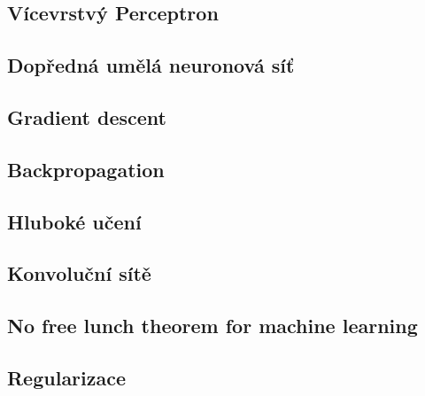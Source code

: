 \subsection{Vícevrstvý Perceptron}
\label{sec:multilayer_perceptron}

\subsection{Dopředná umělá neuronová síť}
\label{sec:feedforward_nn}
\subsection{Gradient descent}
\label{sec:gradient_descent}
\subsection{Backpropagation}
\subsection{Hluboké učení}
\label{sec:deep_learning}
\subsection{Konvoluční sítě}
\label{sec:cnn}

\subsection{No free lunch theorem for machine learning}
\cite{Goodfellow2016}
\subsection{Regularizace}


